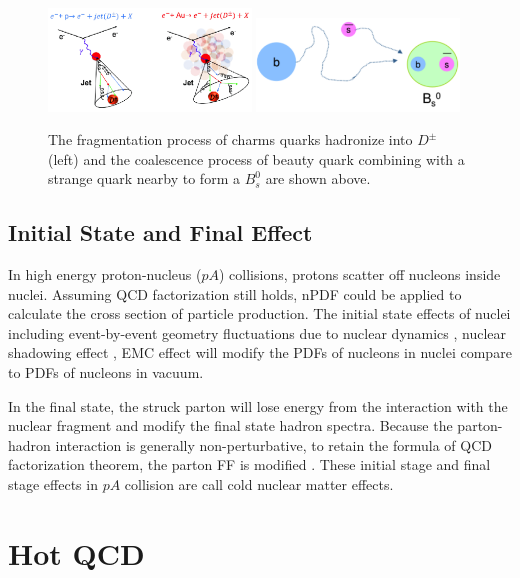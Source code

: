 \begin{figure}[hbtp]
\begin{center}
\includegraphics[width=0.48\textwidth]{Figures/Chapter1/FragCartoon.png}
\includegraphics[width=0.48\textwidth]{Figures/Chapter1/CoalCartoon.png}
\caption{The fragmentation process of charms quarks hadronize into $D^\pm$ (left) and the coalescence process of beauty quark combining with a strange quark nearby to form a $B^0_s$ are shown above.}
\label{HadMech}
\end{center}
\end{figure} 


\subsection{Initial State and Final Effect}

In high energy proton-nucleus ($pA$) collisions, protons scatter off nucleons inside nuclei. Assuming QCD factorization still holds, nPDF could be applied to calculate the cross section of particle production. The initial state effects of nuclei including event-by-event geometry fluctuations due to nuclear dynamics \cite{GuntherV3}, nuclear shadowing effect \cite{NuclearShadowing}, EMC effect \cite{EMC} will modify the PDFs of nucleons in nuclei compare to PDFs of nucleons in vacuum. 

In the final state, the struck parton will lose energy from the interaction with the nuclear fragment and modify the final state hadron spectra. Because the parton-hadron interaction is generally non-perturbative, to retain the formula of QCD factorization theorem, the parton FF is modified \cite{CNEEFF}. These initial stage and final stage effects in $pA$ collision are call cold nuclear matter effects. 

\section{Hot QCD}

